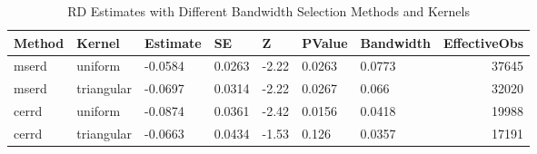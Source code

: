 \begin{table}[ht]
\centering
\caption{RD Estimates with Different Bandwidth Selection Methods and Kernels} 
\label{tab:rd_bandwidth_kernel_results}
\begin{tabular}{lllllllr}
  \hline
Method & Kernel & Estimate & SE & Z & PValue & Bandwidth & EffectiveObs \\ 
  \hline
mserd & uniform & -0.0584 & 0.0263 & -2.22 & 0.0263 & 0.0773 & 37645 \\ 
  mserd & triangular & -0.0697 & 0.0314 & -2.22 & 0.0267 & 0.066 & 32020 \\ 
  cerrd & uniform & -0.0874 & 0.0361 & -2.42 & 0.0156 & 0.0418 & 19988 \\ 
  cerrd & triangular & -0.0663 & 0.0434 & -1.53 & 0.126 & 0.0357 & 17191 \\ 
   \hline
\end{tabular}
\end{table}

